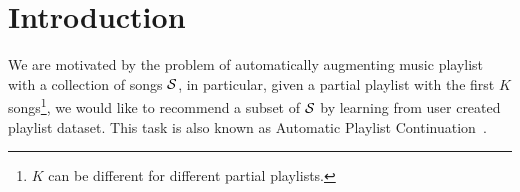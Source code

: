 \section{Introduction}
\label{sec:intro}


We are motivated by the problem of automatically augmenting music playlist with a collection of songs $\mathcal{S}$,
in particular, given a partial playlist with the first $K$ songs\footnote{$K$ can be different for different partial playlists.},
we would like to recommend a subset of $\mathcal{S}$ by learning from user created playlist dataset.
This task is also known as Automatic Playlist Continuation~\cite{schedl2017,recsysch2018}.
